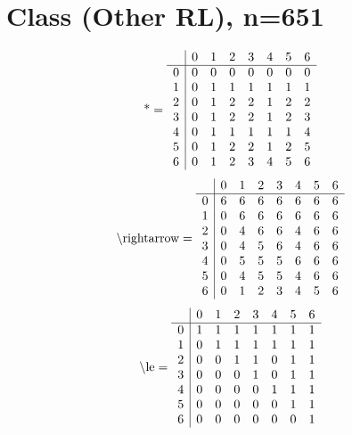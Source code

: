 \documentclass[11pt]{article}
\begin{document}
\section{Class (Other RL), n=651}
\[\text{*} = 
\begin{array}{r | r r r r r r r}
 & 0 & 1 & 2 & 3 & 4 & 5 & 6 \\ \hline
0 & 0 & 0 & 0 & 0 & 0 & 0 & 0 \\
1 & 0 & 1 & 1 & 1 & 1 & 1 & 1 \\
2 & 0 & 1 & 2 & 2 & 1 & 2 & 2 \\
3 & 0 & 1 & 2 & 2 & 1 & 2 & 3 \\
4 & 0 & 1 & 1 & 1 & 1 & 1 & 4 \\
5 & 0 & 1 & 2 & 2 & 1 & 2 & 5 \\
6 & 0 & 1 & 2 & 3 & 4 & 5 & 6 \\
\end{array}
\]
\[\text{\textbackslash rightarrow} = 
\begin{array}{r | r r r r r r r}
 & 0 & 1 & 2 & 3 & 4 & 5 & 6 \\ \hline
0 & 6 & 6 & 6 & 6 & 6 & 6 & 6 \\
1 & 0 & 6 & 6 & 6 & 6 & 6 & 6 \\
2 & 0 & 4 & 6 & 6 & 4 & 6 & 6 \\
3 & 0 & 4 & 5 & 6 & 4 & 6 & 6 \\
4 & 0 & 5 & 5 & 5 & 6 & 6 & 6 \\
5 & 0 & 4 & 5 & 5 & 4 & 6 & 6 \\
6 & 0 & 1 & 2 & 3 & 4 & 5 & 6 \\
\end{array}
\]
\[\text{\textbackslash le} = 
\begin{array}{r | r r r r r r r}
 & 0 & 1 & 2 & 3 & 4 & 5 & 6 \\ \hline
0 & 1 & 1 & 1 & 1 & 1 & 1 & 1 \\
1 & 0 & 1 & 1 & 1 & 1 & 1 & 1 \\
2 & 0 & 0 & 1 & 1 & 0 & 1 & 1 \\
3 & 0 & 0 & 0 & 1 & 0 & 1 & 1 \\
4 & 0 & 0 & 0 & 0 & 1 & 1 & 1 \\
5 & 0 & 0 & 0 & 0 & 0 & 1 & 1 \\
6 & 0 & 0 & 0 & 0 & 0 & 0 & 1 \\
\end{array}
\]
\end{document}
